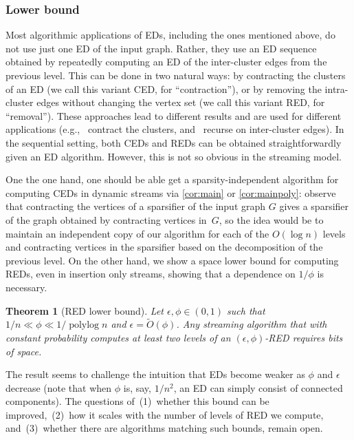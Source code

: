 \documentclass[epsfig,letter,11pt]{article}
\numberwithin{equation}{section}
\newcommand{\otil}{\tilde{O}}
\renewcommand{\tilde}{\widetilde}
\DeclareMathOperator*{\pylog}{polylog}
\newtheorem{mainthsimple}{Theorem}
\begin{document}
\subsubsection*{Lower bound}
Most algorithmic applications of EDs, including the ones mentioned above, do not use just one ED of the input graph. Rather, they use an ED sequence obtained by repeatedly computing an ED of the inter-cluster edges from the previous level. This can be done in two natural ways: by contracting the clusters of an ED (we call this variant CED, for “contraction”), or by removing the intra-cluster edges without changing the vertex set (we call this variant RED, for “removal”). These approaches lead to different results and are used for different applications (e.g.,~\cite{boundlink,mincutjli} contract the clusters, and~\cite{stspectral, maxflow} recurse on inter-cluster edges). In the sequential setting, both CEDs and REDs can be obtained straightforwardly given an ED algorithm. However, this is not so obvious in the streaming model.

One the one hand, one should be able get a sparsity-independent algorithm for computing CEDs in dynamic streams via \cref{cor:main} or \cref{cor:mainpoly}: observe that contracting the vertices of a sparsifier of the input graph $G$  gives a sparsifier of the graph obtained by contracting vertices in~$G$, so the idea would be to maintain an independent copy of our algorithm for each of the $O(\log n)$ levels and contracting vertices in the sparsifier based on the decomposition of the previous level. On the other hand, we show a space lower bound for computing REDs, even in insertion only streams, showing that a dependence on $1/\phi$ is necessary.

\begin{mainthsimple}[RED lower bound]
	\label{th:lbsimple}
	Let $\epsilon,\phi \in (0,1)$ such that $1/n \ll \phi \ll 1/\pylog n$ and $ \epsilon =\otil( \phi)$. Any streaming algorithm that with constant probability computes at least two levels of an $(\epsilon,\phi)$-RED requires  bits of space.
\end{mainthsimple}

\noindent
The result seems to challenge the intuition that EDs become weaker as $\phi$ and $\epsilon$ decrease (note that when $\phi$ is, say, $1/n^2$, an ED can simply consist of connected components). The questions of~(1)~whether this bound can be improved,~(2)~how it scales with the number of levels of RED we compute, and~(3)~whether there are algorithms matching such bounds, remain open.
\end{document}
